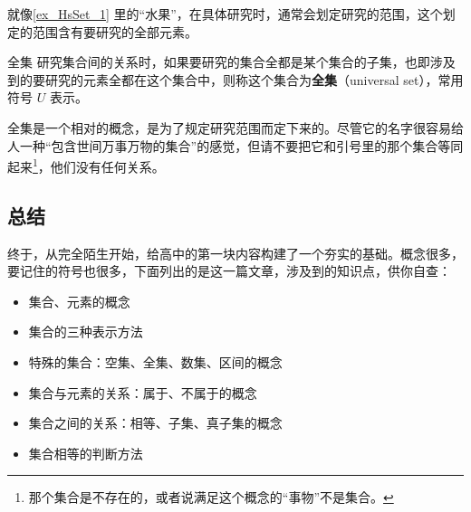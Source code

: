 就像\autoref{ex_HsSet_1} 里的“水果”，在具体研究时，通常会划定研究的范围，这个划定的范围含有要研究的全部元素。

\begin{definition}{全集}\label{def_HsSet_1}
研究集合间的关系时，如果要研究的集合全都是某个集合的子集，也即涉及到的要研究的元素全都在这个集合中，则称这个集合为\textbf{全集}（universal set），常用符号 $U$ 表示。
\end{definition}


全集是一个相对的概念，是为了规定研究范围而定下来的。尽管它的名字很容易给人一种“包含世间万事万物的集合”的感觉，但请不要把它和引号里的那个集合等同起来\footnote{那个集合是不存在的，或者说满足这个概念的“事物”不是集合。}，他们没有任何关系。


\subsection{总结}

终于，从完全陌生开始，给高中的第一块内容构建了一个夯实的基础。概念很多，要记住的符号也很多，下面列出的是这一篇文章，涉及到的知识点，供你自查：

\begin{itemize}
\item 集合、元素的概念
\item 集合的三种表示方法
\item 特殊的集合：空集、全集、数集、区间的概念
\item 集合与元素的关系：属于、不属于的概念
\item 集合之间的关系：相等、子集、真子集的概念
\item 集合相等的判断方法
\end{itemize}














